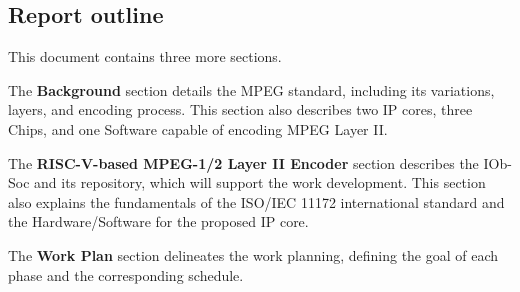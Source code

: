 

\subsection{Report outline}

This document contains three more sections.

The \textbf{Background} section details the MPEG standard, including its variations, layers, and encoding process. This section also describes two IP cores, three Chips, and one Software capable of encoding MPEG Layer II.

The \textbf{RISC-V-based MPEG-1/2 Layer II Encoder} section describes the IOb-Soc and its repository, which will support the work development. This section also explains the fundamentals of the ISO/IEC 11172 international standard and the Hardware/Software for the proposed IP core.

The \textbf{Work Plan} section delineates the work planning, defining the goal of each phase and the corresponding schedule.